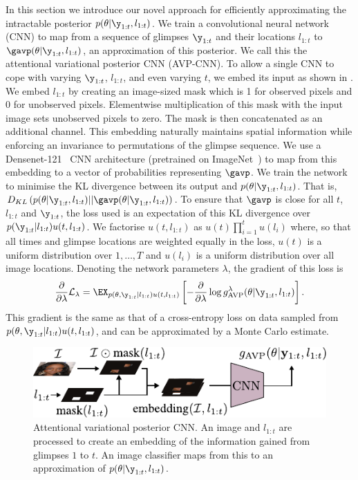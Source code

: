  In this section we introduce
our novel approach for efficiently approximating the intractable posterior
$p(\theta | \y_{1:t}, l_{1:t})$. We train a convolutional neural network (CNN)
to map from a sequence of glimpses $\y_{1:t}$ and their locations $l_{1:t}$ to
$\gavp(\theta | \y_{1:t}, l_{1:t})$, an approximation of this posterior. We call
this the attentional variational posterior CNN (AVP-CNN). To allow a single CNN
to cope with varying $\y_{1:t}$, $l_{1:t}$, and even varying $t$, we embed its
input as shown in . We embed $l_{1:t}$ by creating an
image-sized mask which is 1 for observed pixels and 0 for unobserved pixels.
Elementwise multiplication of this mask with the input image sets unobserved
pixels to zero. The mask is then concatenated as an additional channel. This
embedding naturally maintains spatial information while enforcing an invariance
to permutations of the glimpse sequence. We use a
Densenet-121~\cite{huang2017densely} CNN architecture (pretrained on
ImageNet~\cite{imagenet}) to map from this embedding to a vector of
probabilities representing $\gavp$. We train the network to minimise the KL
divergence between its output and $p(\theta|\y_{1:t},l_{1:t})$. That is,
$D_{KL} \left( p(\theta|\y_{1:t},l_{1:t}) || \gavp(\theta|\y_{1:t},l_{1:t}) \right) $.
To ensure that $\gavp$ is close for all $t$, $l_{1:t}$ and $\y_{1:t}$, the loss
used is an expectation of this KL divergence over
$p(\y_{1:t}|l_{1:t})u(t, l_{1:t})$. We factorise $u(t, l_{1:t})$ as
$u(t)\prod_{i=1}^tu(l_i)$ where, so that all times and glimpse locations are
weighted equally in the loss, $u(t)$ is a uniform distribution over $1,\ldots,T$
and $u(l_i)$ is a uniform distribution over all image locations. Denoting the
network parameters $\lambda$, the gradient of this loss is
\begin{align} \label{eq:dropout-cnn-gradient}
  \frac{\partial}{\partial\lambda} \mathcal{L}_\lambda = \EX_{p(\theta, \y_{1:t}|l_{1:t})u(t, l_{1:t})} \left[ - \frac{\partial}{\partial\lambda} \log g_\text{AVP}^{\lambda}(\theta | \y_{1:t}, l_{1:t}) \right].
\end{align}
This gradient is the same as that of a cross-entropy loss on data sampled from
$p(\theta, \y_{1:t}|l_{1:t})u(t, l_{1:t})$, and can be approximated by a Monte
Carlo estimate.

\begin{figure}
  \centering
  \includegraphics[scale=1]{figs/nogs/dropout-cnn}
  \caption{Attentional variational posterior CNN. An image and $l_{1:t}$ are
    processed to create an embedding of the information gained from glimpses $1$
    to $t$. An image classifier maps from this to an approximation of
    $p(\theta|\y_{1:t}, l_{1:t})$.}
  \label{fig:dropout-cnn}
\end{figure}

